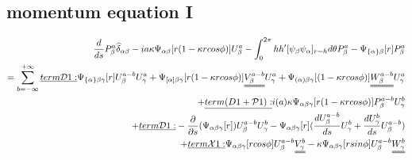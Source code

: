 \documentclass{Note}
\begin{document}
\subsection{momentum equation I}
\begin{equation}
\begin{aligned}
{d\over {ds}}P_\beta^a\widehat{\delta }_{\alpha\beta}-ia\kappa \Psi_{\alpha\beta}[r(1-\kappa rcos\phi)]U_\beta^a
-\int_0^{2\pi} hh'[ \psi_\beta \psi_\alpha ]_{r=h} d\theta P_\beta^a-\Psi_{\{\alpha\}\beta}[r] P_\beta^a\\
= \sum_{b=-\infty}^{+\infty}
\underline{term \mathcal{D}1:}  \Psi_{\{\alpha\}\beta\gamma} [r]U_\beta^{a-b}U_\gamma^a
+\Psi_{[\alpha]\beta\gamma} [r(1-\kappa rcos\phi)]\uuline{V_\beta^{a-b}}U_\gamma^a
+ \Psi_{(\alpha)\beta\gamma} [(1-\kappa rcos\phi)]\uuline{W_\beta^{a-b}}U_\gamma^a\\
+\underline{term\mathcal({D}1+\mathcal{P}1):}  i(a)\kappa \Psi_{\alpha\beta\gamma}[r(1-\kappa r cos\phi)]P_\beta^{a-b}U_\gamma^{b}\\
+\underline{term \mathcal{D}1:} -{{\partial }\over {\partial s}}(\Psi_{\alpha\beta\gamma}[r])U_\beta^{a-b}U_\gamma^{b}
-\Psi_{\alpha\beta\gamma}[r]({{d U_\beta^{a-b} \over {d s}}U_\gamma^{b}}+{dU_\gamma^{b}\over ds}U_\beta^{a-b})\\
+\underline{term \mathcal{X}1:} \Psi_{\alpha\beta\gamma}[rcos\phi]U_\beta^{a-b}\uuline{V_\gamma^b}-\kappa \Psi_{\alpha\beta\gamma}[r sin\phi]U_\beta^{a-b}\uuline{W_\gamma^b}\\
\end{aligned}
\end{equation}
\end{document}
